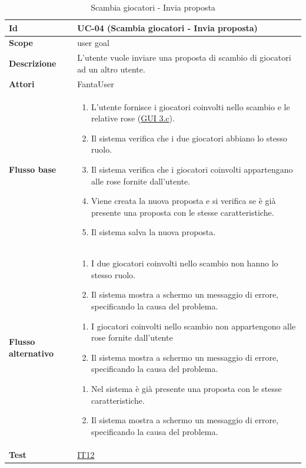 \begin{table}[H]
\caption{Scambia giocatori - Invia proposta}
\label{UC-04}

\begin{tabularx}{\textwidth}{|l|X|}
\hline
\textbf{Id} & UC-04 (Scambia giocatori - Invia proposta) \\
\hline
\textbf{Scope} & user goal \\
\hline
\textbf{Descrizione} & L'utente vuole inviare una proposta di scambio di giocatori ad un altro utente. \\
\hline
\textbf{Attori} & FantaUser \\
\hline
\textbf{Flusso base} &
\begin{enumerate}[leftmargin=*]
    \item L'utente fornisce i giocatori coinvolti nello scambio e le relative rose (\hyperref[fig:mockup_parte3]{GUI 3.c}).
    \item Il sistema verifica che i due giocatori abbiano lo stesso ruolo.
    \item Il sistema verifica che i giocatori coinvolti appartengano alle rose fornite dall'utente.
    \item Viene creata la nuova proposta e si verifica se è già presente una 
            proposta con le stesse caratteristiche.
    \item Il sistema salva la nuova proposta.
\end{enumerate} \\
\hline
\textbf{Flusso alternativo} &
\begin{enumerate}[leftmargin=*,label=2.\arabic*]
    \item I due giocatori coinvolti nello scambio non hanno lo stesso ruolo.
    \item Il sistema mostra a schermo un messaggio di errore, specificando la causa del problema.
\end{enumerate}
\begin{enumerate}[leftmargin=*,label=3.\arabic*]
    \item I giocatori coinvolti nello scambio non appartengono alle rose fornite dall'utente
    \item Il sistema mostra a schermo un messaggio di errore, specificando la causa del problema.
\end{enumerate} 
\begin{enumerate}[leftmargin=*,label=4.\arabic*]
    \item Nel sistema è già presente una proposta con le stesse caratteristiche.
    \item Il sistema mostra a schermo un messaggio di errore, specificando la causa del problema.
\end{enumerate} \\
\hline
\textbf{Test} & \hyperref[IT12]{IT12} \\
\hline
\end{tabularx}

\end{table}



